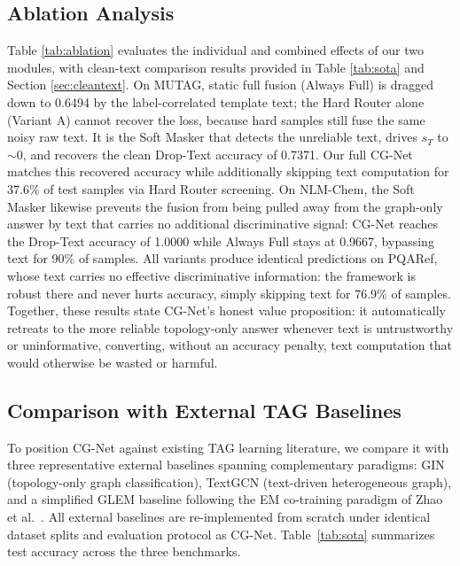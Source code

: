 \documentclass[preprint,12pt,authoryear]{elsarticle}
\begin{document}
\subsection{Ablation Analysis}
Table \ref{tab:ablation} evaluates the individual and combined effects of our two modules, with clean-text comparison results provided in Table \ref{tab:sota} and Section \ref{sec:cleantext}. On MUTAG, static full fusion (Always Full) is dragged down to 0.6494 by the label-correlated template text; the Hard Router alone (Variant A) cannot recover the loss, because hard samples still fuse the same noisy raw text. It is the Soft Masker that detects the unreliable text, drives $s_T$ to $\sim$0, and recovers the clean Drop-Text accuracy of 0.7371. Our full CG-Net matches this recovered accuracy while additionally skipping text computation for 37.6\% of test samples via Hard Router screening. On NLM-Chem, the Soft Masker likewise prevents the fusion from being pulled away from the graph-only answer by text that carries no additional discriminative signal: CG-Net reaches the Drop-Text accuracy of 1.0000 while Always Full stays at 0.9667, bypassing text for 90\% of samples.
All variants produce identical predictions on PQARef, whose text carries no effective discriminative information: the framework is robust there and never hurts accuracy, simply skipping text for 76.9\% of samples. Together, these results state CG-Net's honest value proposition: it automatically retreats to the more reliable topology-only answer whenever text is untrustworthy or uninformative, converting, without an accuracy penalty, text computation that would otherwise be wasted or harmful.

\subsection{Comparison with External TAG Baselines}
To position CG-Net against existing TAG learning literature, we compare it with three representative external baselines spanning complementary paradigms: GIN (topology-only graph classification), TextGCN (text-driven heterogeneous graph), and a simplified GLEM baseline following the EM co-training paradigm of Zhao et al.~\citep{zhao2023glem}. All external baselines are re-implemented from scratch under identical dataset splits and evaluation protocol as CG-Net. Table~\ref{tab:sota} summarizes test accuracy across the three benchmarks.
\end{document}
